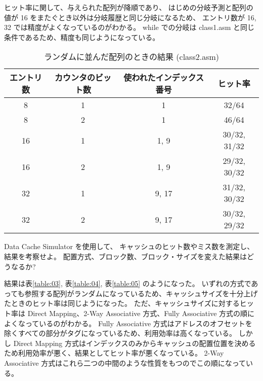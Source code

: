 \documentclass[11pt,dvipdfmx,a4paper]{jsarticle}
\begin{document}
ヒット率に関して、与えられた配列が降順であり、
はじめの分岐予測と配列の値が 16 をまたぐとき以外は分岐履歴と同じ分岐になるため、
エントリ数が 16, 32 では精度がよくなっているのがわかる。
while での分岐は class1.asm と同じ条件であるため、精度も同じようになっている。

\begin{table}[H]
    \centering
    \caption{ランダムに並んだ配列のときの結果 (class2.asm)}
    \label{table:02}
    \begin{tabular}{cccc}
        \hline
        エントリ数 & カウンタのビット数 & 使われたインデックス番号 & ヒット率\\
        \hline
        8 & 1 & 1 & 32/64\\
        8 & 2 & 1 & 46/64\\
        16 & 1 & 1, 9 & 30/32, 31/32\\
        16 & 2 & 1, 9 & 29/32, 30/32\\
        32 & 1 & 9, 17 & 31/32, 30/32\\
        32 & 2 & 9, 17 & 30/32, 29/32\\
        \hline
    \end{tabular}
\end{table}


\begin{tcolorbox}[colbacktitle=white, coltitle=black, colback=white, title=課題2]
    Data Cache Simulator を使用して、
    キャッシュのヒット数やミス数を測定し、結果を考察せよ。
    配置方式、ブロック数、ブロック・サイズを変えた結果はどうなるか?
\end{tcolorbox}
結果は表\ref{table:03}, 表\ref{table:04}, 表\ref{table:05} のようになった。
いずれの方式であっても参照する配列がランダムになっているため、キャッシュサイズを十分上げたときのヒット率は同じようになった。
ただ、キャッシュサイズに対するヒット率は Direct Mapping、2-Way Associative 方式、Fully Associative 方式の順によくなっているのがわかる。
Fully Associative 方式はアドレスのオフセットを除くすべての部分がタグになっているため、利用効率は高くなっている。
しかし Direct Mapping 方式はインデックスのみからキャッシュの配置位置を決めるため利用効率が悪く、結果としてヒット率が悪くなっている。
2-Way Associative 方式はこれら二つの中間のような性質をもつのでこの順になっている。
\end{document}
